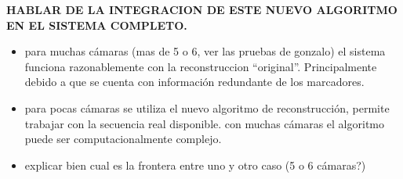 \textbf{HABLAR DE LA INTEGRACION DE ESTE NUEVO ALGORITMO EN EL SISTEMA COMPLETO.\\}
\begin{itemize}
\item para muchas cámaras (mas de 5 o 6, ver las pruebas de gonzalo) el sistema funciona razonablemente con la reconstruccion ``original''. Principalmente debido a que se cuenta con información redundante de los marcadores.
\item para pocas cámaras se utiliza el nuevo algoritmo de reconstrucción, permite trabajar con la secuencia real disponible. con muchas cámaras el algoritmo puede ser computacionalmente complejo.
\item explicar bien cual es la frontera entre uno y otro caso (5 o 6 cámaras?)
\end{itemize}


